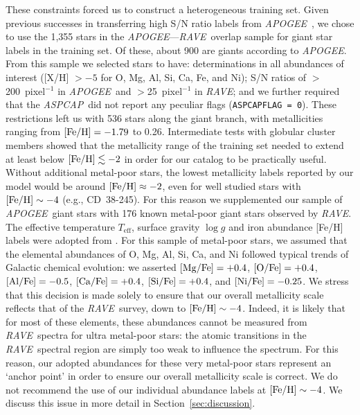 \documentclass[preprint]{aastex61}
\newcommand{\acronym}[1]{{\small{#1}}}
\newcommand{\project}[1]{\textsl{#1}}
\newcommand{\rave}{\project{\acronym{RAVE}}}
\newcommand{\apogee}{\project{\acronym{APOGEE}}}
\newcommand{\aspcap}{\project{\acronym{ASPCAP}}}
\newcommand{\teff}{T_{\mathrm{eff}}}
\newcommand{\logg}{\log g}
\begin{document}
These constraints forced us to construct a heterogeneous training set.  Given previous
successes in transferring high S/N ratio labels from \apogee\ \citep{Ness_2015,
Ness_2016,Ho_2016,Casey_2016b}, we chose to use the 1,355 stars in the \apogee---\rave\ 
overlap sample for giant star labels in the training set.  Of these, about 900 are 
giants according to \apogee.  From this sample we selected stars to have: 
determinations in all abundances of interest ([X/H] $> -5$ for O, Mg, Al, Si, Ca, Fe, 
and Ni); S/N ratios of $>$200~pixel$^{-1}$ in \apogee\ and $>$25~pixel$^{-1}$ in \rave; 
and we further required that the \aspcap\ did not report any peculiar flags 
(\texttt{ASPCAPFLAG = 0}).  These restrictions left us with 536 stars along the giant 
branch, with metallicities ranging from $[{\rm Fe/H}] = -1.79$ to 0.26.  Intermediate 
tests with globular cluster members showed that the metallicity range of the training 
set needed to extend at least below $[{\rm Fe/H}] \lesssim -2$ in order for our catalog 
to be practically useful.  Without additional metal-poor stars, the lowest metallicity
labels reported by our model would be around $[{\rm Fe/H}] \approx -2$, even for well
studied stars with $[{\rm Fe/H}] \sim -4$ (e.g., CD~38-245).  For this reason we
supplemented our sample of \apogee\ giant stars with 176 known metal-poor giant stars 
observed by \rave.  The effective temperature $\teff$, surface gravity $\logg$ and
iron abundance [Fe/H] labels were adopted from \citet{Fulbright_2010, Ruchti_2011}.
For this sample of metal-poor stars, we assumed that the elemental abundances of O, 
Mg, Al, Si, Ca, and Ni followed typical trends of Galactic chemical evolution: we
asserted $[{\rm Mg/Fe}] = +0.4$, $[{\rm O/Fe}] = +0.4$, $[{\rm Al/Fe}] = -0.5$, 
$[{\rm Ca/Fe}] = +0.4$, $[{\rm Si/Fe}] = +0.4$, and $[{\rm Ni/Fe}] = -0.25$.  We stress
that this decision is made solely to ensure that our overall metallicity scale reflects
that of the \rave\ survey, down to $[{\rm Fe/H}] \sim -4$.  Indeed, it is likely that 
for most of these elements, these abundances cannot be measured from \rave\ spectra for 
ultra metal-poor stars: the atomic transitions in the \rave\ spectral region are simply
too weak to influence the spectrum.  For this reason, our adopted abundances for these
very metal-poor stars represent an `anchor point' in order to ensure our overall 
metallicity scale is correct.  We do not recommend the use of our individual abundance
labels at $[{\rm Fe/H}] \sim -4$.  We discuss this issue in more detail in Section~\ref{sec:discussion}.
\end{document}
